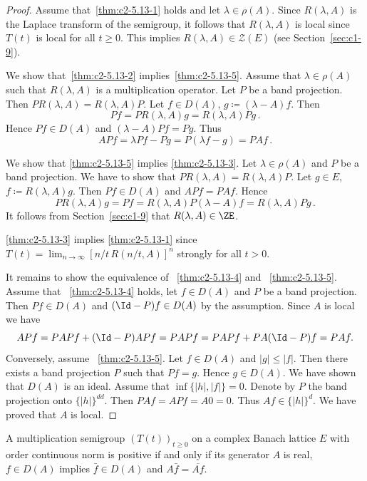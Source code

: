 \begin{proof}
Assume that~\ref{thm:c2-5.13-1}   holds and let $\lambda \in \rho(A)$.
Since $R(\lambda,A)$ is the Laplace transform of the semigroup, it follows that $R(\lambda,A)$ is local since $T(t)$ is local for all $t \geq 0$.
This implies $R(\lambda,A) \in \mathcal{Z}(E)$ (see Section~\ref{sec:c1-9}).

We show that~\ref{thm:c2-5.13-2}   implies~\ref{thm:c2-5.13-5}.
Assume that $\lambda \in \rho(A)$ such that $R(\lambda,A)$ is a multiplication operator.
Let $P$ be a band projection.
Then $PR(\lambda,A) = R(\lambda,A)P$.
Let $f \in D(A)$, $g \coloneqq (\lambda-A)f$.
Then 
\[
Pf = PR(\lambda,A)g = R(\lambda,A)Pg\,.
\]
Hence $Pf \in D(A)$ and $(\lambda-A)Pf = Pg$.
Thus 
\[
APf= \lambda Pf - Pg = P(\lambda f - g) = PAf\,.
\]

We show that \ref{thm:c2-5.13-5}   implies \ref{thm:c2-5.13-3}.
Let $\lambda \in \rho(A)$ and $P$ be a band projection.
We have to show that $PR(\lambda,A) = R(\lambda,A)P$.
Let $g \in E$, $f \coloneqq R(\lambda,A)g$.
Then $Pf \in D(A)$ and $APf = PAf$.
Hence 
\[
PR(\lambda,A)g = Pf = R(\lambda,A)P(\lambda-A)f = R(\lambda,A)Pg\,.
\]
It follows from Section~\ref{sec:c1-9} 
that $R(\lambda,A) \in \ZE$.

\ref{thm:c2-5.13-3}   implies \ref{thm:c2-5.13-1}   since $T(t) = \lim_{n \to \infty} [n/t\,R(n/t,A)]^{n}$ strongly for all $t > 0$.

It remains to show the equivalence of ~\ref{thm:c2-5.13-4}   and ~\ref{thm:c2-5.13-5}.
Assume that ~\ref{thm:c2-5.13-4}   holds, let $f \in D(A)$ and $P$ be a band projection.
Then $Pf \in D(A)$ and $(\Id-P)f \in D(A)$ by the assumption.
Since $A$ is local we have 
\[
APf = PAPf + (\Id-P)APf = PAPf = PAPf + PA(\Id-P)f = PAf.
\]
Conversely, assume ~\ref{thm:c2-5.13-5}.
Let $f \in D(A)$ and $|g| \leq |f|$.
Then there exists a band projection $P$ such that $Pf = g$.
Hence $g \in D(A)$.
We have shown
that $D(A)$ is an ideal.
Assume that $\inf\{|h|,|f|\} = 0$.
Denote by $P$ the band projection onto $\{|h|\}^{dd}$.
Then $PAf = APf = A0 = 0$.
Thus $Af \in \{|h|\}^{d}$.
We have proved that $A$ is local.
\end{proof}
\begin{corollary}\label{cor:c2-5.14}
%
A multiplication semigroup $(T(t))_{t \geq 0}$ on a complex Banach lattice $E$ with order continuous norm is positive if and only if its generator $A$ is real, \ie $f \in D(A)$ implies $\bar{f} \in D(A)$ and $A\bar{f} = \overline{Af}$.
\end{corollary}

